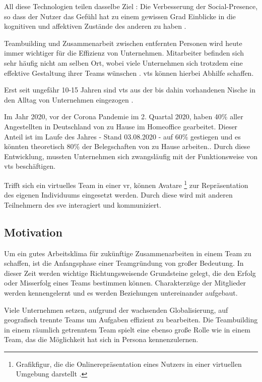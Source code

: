 \documentclass[a4paper,11pt]{article}%
\renewcommand{\\}{\vspace*{0.5\baselineskip} \newline}
\begin{document}
All diese Technologien teilen dasselbe Ziel : \\ \dq{}Die Verbesserung der \dq{}Social-Presence\dq{}, so dass der Nutzer das Gefühl hat zu einem gewissen Grad Einblicke in die kognitiven und affektiven Zustände des anderen zu haben \dq{} \citep{biocca2002defining} \citep[p.407–447]{biocca2001plugging}.

Teambuilding und Zusammenarbeit zwischen entfernten Personen wird heute immer wichtiger für die Effizienz von Unternehmen. Mitarbeiter befinden sich sehr häufig nicht am selben Ort, wobei viele Unternehmen sich trotzdem eine effektive Gestaltung ihrer Teams wünschen \citep[p.791-792]{jarvenpaa1999communication}. \ac{vts} können hierbei Abhilfe schaffen. 
	
Erst seit ungefähr 10-15 Jahren sind \ac{vts} aus der bis dahin vorhandenen Nische in den Alltag von Unternehmen eingezogen \citep{gilson2015virtual}.

Im Jahr 2020, vor der Corona Pandemie im 2. Quartal 2020, haben 40\% aller Angestellten in Deutschland von zu Hause im \dq{}Homeoffice\dq{} gearbeitet. Dieser Anteil ist im Laufe des Jahres - Stand 03.08.2020 - auf 60\% gestiegen und es könnten theoretisch 80\% der Belegschaften von zu Hause arbeiten.\citep{statistaCorona2020}. Durch diese Entwicklung, mussten Unternehmen sich zwangsläufig mit der Funktionsweise von \ac{vts} beschäftigen.

Trifft sich ein virtuelles Team in einer \ac{vr}, können Avatare \footnote{Grafikfigur, die die Onlinerepräsentation eines Nutzers in einer virtuellen Umgebung darstellt \citep[p.1]{neustaedter2009presenting}.} zur Repräsentation des eigenen Individuums eingesetzt werden. Durch diese wird mit anderen Teilnehmern des \ac{sve} interagiert und kommuniziert.

\newpage
	\subsection{Motivation}
	Um ein gutes Arbeitsklima für zukünftige Zusammenarbeiten in einem Team zu schaffen, ist die Anfangsphase einer Teamgründung von großer Bedeutung. In dieser Zeit werden wichtige Richtungsweisende Grundsteine gelegt, die den Erfolg oder Misserfolg eines Teams bestimmen können. Charakterzüge der Mitglieder werden kennengelernt und es werden Beziehungen untereinander aufgebaut.
	
	Viele Unternehmen setzen, aufgrund der wachsenden Globalisierung, auf geografisch trennte Teams um Aufgaben effizient zu bearbeiten. Die Teambuilding in einem räumlich getrenntem Team spielt eine ebenso große Rolle wie in einem Team, das die Möglichkeit hat sich in Persona kennenzulernen.
	
\end{document}
